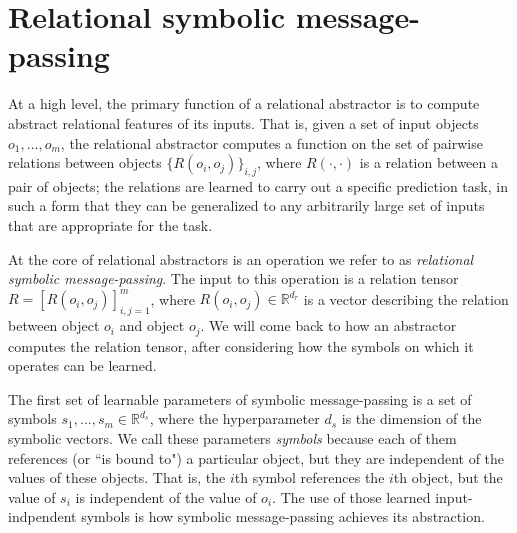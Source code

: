 
\def\m{m}


\section{Relational symbolic message-passing}
\label{sec:message_passing}

At a high level, the primary function of a relational abstractor is to compute abstract relational features of its
inputs. That is, given a set of input objects $o_1, \ldots, o_\m$, the relational abstractor computes a function on
the set of pairwise relations between objects $\{ R(o_i, o_j) \}_{i,j}$, where $R(\cdot, \cdot)$ is a relation between a pair of objects; the relations are learned to carry out a specific prediction task,
in such a form that they can be generalized to any arbitrarily large set of inputs that are appropriate for the task.

At the core of relational abstractors is an operation we refer to as \textit{relational symbolic message-passing}.
The input to this operation is a relation tensor $R = \left[R(o_i, o_j)\right]_{i,j=1}^\m$, where $R(o_i, o_j) \in \mathbb{R}^{d_r}$ is a vector describing the relation between object $o_i$ and object $o_j$. We will come back to how an abstractor computes the relation tensor,
after considering how the symbols on which it operates can be learned.

The first set of learnable parameters of symbolic message-passing is a set of symbols $s_1, \ldots, s_\m \in \mathbb{R}^{d_s}$, where the hyperparameter $d_s$ is the dimension of the symbolic vectors. We call these parameters \textit{symbols} because each of them references (or ``is bound to") a particular object, but they are independent of the values of these objects. That is, the $i$th symbol references the $i$th object, but the value of $s_i$ is independent of the value of $o_i$. The use of those learned input-indpendent symbols is how symbolic message-passing achieves its abstraction.

